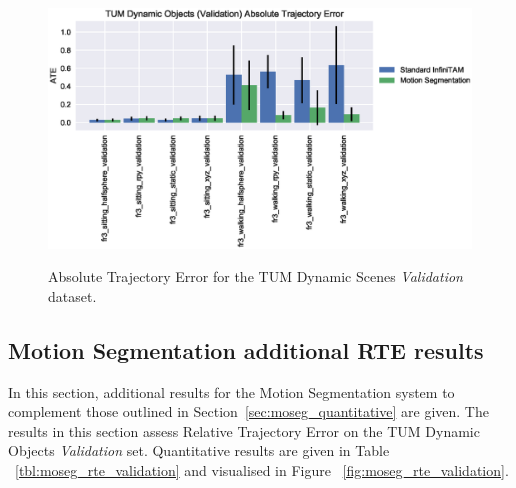 \begin{figure}[!htbp]
~\label{fig:moseg_ate_validation}
  \centering
  \includegraphics[width=\linewidth]{figures/moseg/ate_validation.eps}
  \caption[Motion Segmentation ATE Validation Set]
  {Absolute Trajectory Error for the TUM Dynamic Scenes
    \textit{Validation} dataset.}
\end{figure}

\subsection{Motion Segmentation additional RTE results}
In this section, additional results for the Motion Segmentation system
to complement those outlined in Section~\ref{sec:moseg_quantitative} are given.
The results in this section assess Relative Trajectory Error on the TUM Dynamic
Objects \textit{Validation} set. Quantitative results are given in Table
~\ref{tbl:moseg_rte_validation} and visualised in Figure
~\ref{fig:moseg_rte_validation}.

